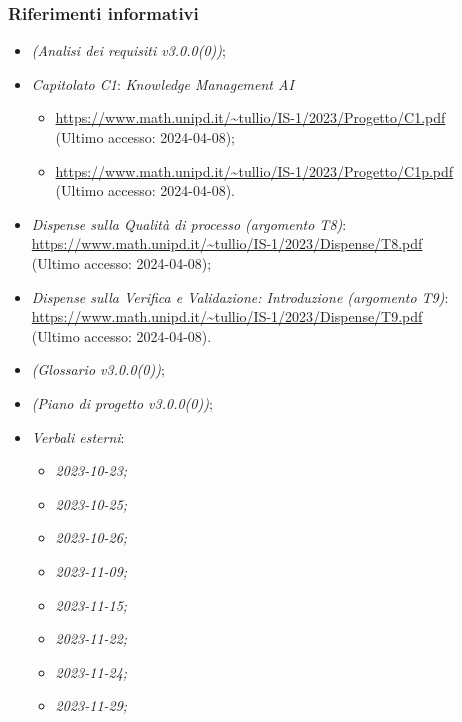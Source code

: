 \documentclass[10pt, a4paper]{article}
\begin{document}
    \subsubsection{Riferimenti informativi}
    \begin{itemize}
        \item \textit{(Analisi dei requisiti v3.0.0(0))};
        \item \textit{Capitolato C1}: \textit{Knowledge Management AI}
        \begin{itemize}
            \item \url{https://www.math.unipd.it/~tullio/IS-1/2023/Progetto/C1.pdf}\\
            (Ultimo accesso: 2024-04-08);
            \item \url{https://www.math.unipd.it/~tullio/IS-1/2023/Progetto/C1p.pdf}\\
            (Ultimo accesso: 2024-04-08).
        \end{itemize}
        \item \textit{Dispense sulla Qualità di processo (argomento T8)}: \\
            \url{https://www.math.unipd.it/~tullio/IS-1/2023/Dispense/T8.pdf}\\
            (Ultimo accesso: 2024-04-08);
        \item \textit{Dispense sulla Verifica e Validazione: Introduzione (argomento T9)}: \\
            \url{https://www.math.unipd.it/~tullio/IS-1/2023/Dispense/T9.pdf}\\
            (Ultimo accesso: 2024-04-08).
        \item \textit{(Glossario v3.0.0(0))};
        \item \textit{(Piano di progetto v3.0.0(0))};
        \item \textit{Verbali esterni}:
            \begin{itemize}
                \item \textit{2023-10-23;}
                \item \textit{2023-10-25;}
                \item \textit{2023-10-26;}
                \item \textit{2023-11-09;}
                \item \textit{2023-11-15;}
                \item \textit{2023-11-22;}
                \item \textit{2023-11-24;}
                \item \textit{2023-11-29;}

\end{itemize}
\end{itemize}
\end{document}
